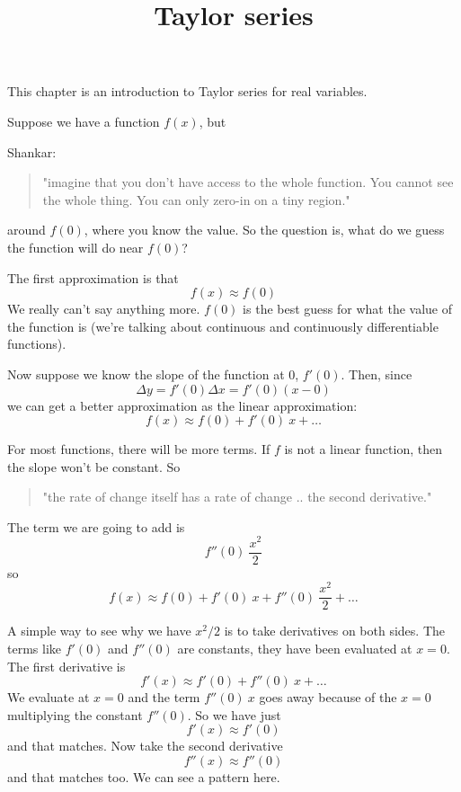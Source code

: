 \documentclass[11pt, oneside]{article}
\title{Taylor series}
\date{}
\begin{document}
\maketitle
\Large


\label{sec:taylor_real}

This chapter is an introduction to Taylor series for real variables.

Suppose we have a function $f(x)$, but 

Shankar:

\begin{quote}"imagine that you don't have access to the whole function.  You cannot see the whole thing.  You can only zero-in on a tiny region."\end{quote}

around $f(0)$, where you know the value.  So the question is, what do we guess the function will do near $f(0)$?  
 
The first approximation is that
\[ f(x) \approx f(0) \]
We really can't say anything more.  $f(0)$ is the best guess for what the value of the function is (we're talking about continuous and continuously differentiable functions).

Now suppose we know the slope of the function at $0$, $f'(0)$.  Then, since 
\[ \Delta y = f'(0) \Delta x = f'(0) (x - 0) \]
we can get a better approximation as the linear approximation:
\[ f(x) \approx f(0) + f'(0)\ x + \dots \]

For most functions, there will be more terms.  If $f$ is not a linear function, then the slope won't be constant.  So 

\begin{quote}"the rate of change itself has a rate of change .. the second derivative."\end{quote}  

The term we are going to add is
\[ f''(0)\ \frac{x^2}{2} \]
so
\[ f(x) \approx f(0) + f'(0)\ x + f''(0)\ \frac{x^2}{2}  + \dots \]

A simple way to see why we have $x^2/2$ is to take derivatives on both sides.  The terms like $f'(0)$ and $f''(0)$ are constants, they have been evaluated at $x=0$. The first derivative is
\[ f'(x) \approx  f'(0) + f''(0)\ x  + \dots \]
We evaluate at $x=0$ and the term $f''(0)\ x$ goes away because of the $x=0$ multiplying the constant $f''(0)$.  So we have just
\[ f'(x) \approx  f'(0)  \]
and that matches. Now take the second derivative
\[ f''(x) \approx  f''(0) \]
and that matches too.  We can see a pattern here.  
\end{document}
